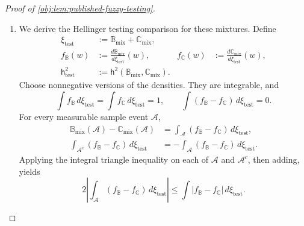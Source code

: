 \documentclass[11pt]{article}
\begin{document}
\begin{proof}[Proof of \cref{obj:lem:published-fuzzy-testing}]
\begin{enumerate}
\item We derive the Hellinger testing comparison for these mixtures. Define
\[
\begin{aligned}
\xi_{\mathrm{test}}&:=\mathbb B_{\mathrm{mix}}+\mathbb C_{\mathrm{mix}},\\
f_{\mathbb B}(w)&:=\frac{d\mathbb B_{\mathrm{mix}}}{d\xi_{\mathrm{test}}}(w),
&
f_{\mathbb C}(w)&:=\frac{d\mathbb C_{\mathrm{mix}}}{d\xi_{\mathrm{test}}}(w),\\
\mathsf h_{\mathrm{test}}^2
&:=\mathsf h^2(\mathbb B_{\mathrm{mix}},\mathbb C_{\mathrm{mix}}).
\end{aligned}
\]
Choose nonnegative versions of the densities. They are integrable, and
\[
\int f_{\mathbb B}\,d\xi_{\mathrm{test}}
=\int f_{\mathbb C}\,d\xi_{\mathrm{test}}=1,
\qquad
\int(f_{\mathbb B}-f_{\mathbb C})\,d\xi_{\mathrm{test}}=0.
\]
For every measurable sample event \(\mathcal A\),
\[
\begin{aligned}
\mathbb B_{\mathrm{mix}}(\mathcal A)
-\mathbb C_{\mathrm{mix}}(\mathcal A)
&=\int_{\mathcal A}(f_{\mathbb B}-f_{\mathbb C})\,d\xi_{\mathrm{test}},\\
\int_{\mathcal A^c}(f_{\mathbb B}-f_{\mathbb C})\,d\xi_{\mathrm{test}}
&=-\int_{\mathcal A}(f_{\mathbb B}-f_{\mathbb C})\,d\xi_{\mathrm{test}}.
\end{aligned}
\]
Applying the integral triangle inequality on each of \(\mathcal A\) and
\(\mathcal A^c\), then adding, yields
\[
2\left|
\int_{\mathcal A}(f_{\mathbb B}-f_{\mathbb C})\,d\xi_{\mathrm{test}}
\right|
\le
\int|f_{\mathbb B}-f_{\mathbb C}|\,d\xi_{\mathrm{test}}.
\]


\end{enumerate}
\end{proof}
\end{document}
